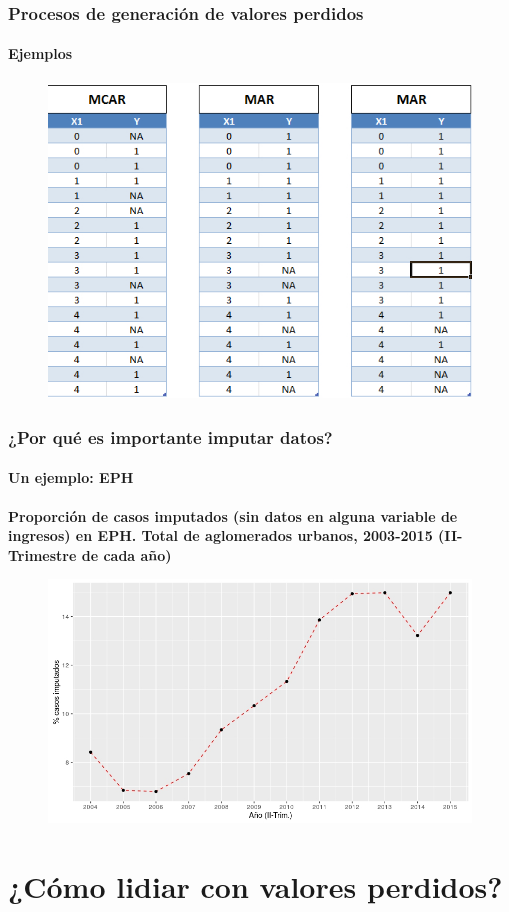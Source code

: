 \documentclass{beamer}
\begin{document}
\begin{frame}
	\frametitle{Procesos de generación de valores perdidos}
	\framesubtitle{Ejemplos}
	\begin{figure}
		\centering
		\includegraphics[width=0.55\linewidth, height=0.66\textheight]{../img/2_patterns}
\end{figure}
\end{frame}

\begin{frame}
	\frametitle{¿Por qué es importante imputar datos?}
	\framesubtitle{Un ejemplo: EPH}
	\small{\textbf{Proporción de casos imputados (sin datos en alguna variable de ingresos) en EPH. Total de aglomerados urbanos, 2003-2015 (II-Trimestre de cada año)}}
	\begin{figure}
		\centering
		\includegraphics[width=0.7\linewidth, height=0.55\textheight]{../img/4_ehp_NR}
	\end{figure}
\end{frame}

\section{¿Cómo lidiar con valores perdidos?}
\end{document}
